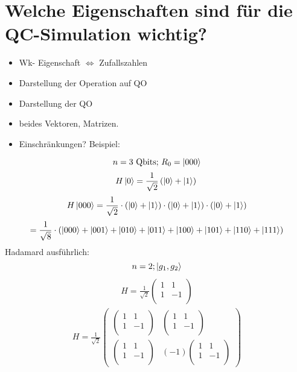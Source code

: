 \section{Welche Eigenschaften sind für die QC-Simulation wichtig?}
\begin{itemize}
    \item Wk- Eigenschaft $\Longleftrightarrow$ Zufallszahlen
    \item Darstellung der Operation auf QO
    \item Darstellung der QO
    \item beides Vektoren, Matrizen.
    \item Einschränkungen? Beispiel:
\end{itemize}
$$
n=3 \text{ Qbits; } R_0 = \ket{000}
$$
$$
H\ket{0}=\frac{1}{\sqrt{2} } \left(\ket{0}+\ket{1}\right) \\
$$
$$
H\ket{000}=\frac{1}{\sqrt{2} }\cdot \left(\ket{0}+\ket{1}\right)\cdot \left(\ket{0}+\ket{1}\right)\cdot \left(\ket{0}+\ket{1}\right)
$$
$$
=\frac{1}{\sqrt{8} }\cdot \left(\ket{000}+\ket{001}+\ket{010}+\ket{011}+\ket{100}+\ket{101}+\ket{110}+\ket{111}\right)
$$
Hadamard ausführlich:
$$
n=2; \ket{g_1, g_2}
$$
$$
\begin{align}
    H = \frac{1}{\sqrt{2}}
    \begin{pmatrix}
        1 & 1\\
        1 & -1\\
    \end{pmatrix}
\end{align}
$$
$$
\begin{align}
    H = \frac{1}{\sqrt{2}}
    \begin{pmatrix}
        \begin{pmatrix}
            1 & 1\\
            1 & -1\\
        \end{pmatrix}
        & 
        \begin{pmatrix}
            1 & 1\\
            1 & -1\\
        \end{pmatrix}
        \\
        \begin{pmatrix}
            1 & 1\\
            1 & -1\\
        \end{pmatrix}
        & 
        (-1)\begin{pmatrix}
            1 & 1\\
            1 & -1\\
        \end{pmatrix}
    \end{pmatrix}
\end{align}
$$
